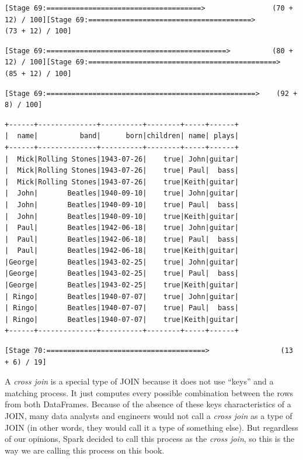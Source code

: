 \documentclass[
  11pt,
  letterpaper,
  DIV=11,
  numbers=noendperiod]{scrreprt}
\begin{document}
\begin{verbatim}
[Stage 69:=====================================>                (70 + 12) / 100][Stage 69:=======================================>              (73 + 12) / 100]
\end{verbatim}

\begin{verbatim}
[Stage 69:===========================================>          (80 + 12) / 100][Stage 69:=============================================>        (85 + 12) / 100]
\end{verbatim}

\begin{verbatim}
[Stage 69:==================================================>    (92 + 8) / 100]                                                                                
\end{verbatim}

\begin{verbatim}
+------+--------------+----------+--------+-----+------+
|  name|          band|      born|children| name| plays|
+------+--------------+----------+--------+-----+------+
|  Mick|Rolling Stones|1943-07-26|    true| John|guitar|
|  Mick|Rolling Stones|1943-07-26|    true| Paul|  bass|
|  Mick|Rolling Stones|1943-07-26|    true|Keith|guitar|
|  John|       Beatles|1940-09-10|    true| John|guitar|
|  John|       Beatles|1940-09-10|    true| Paul|  bass|
|  John|       Beatles|1940-09-10|    true|Keith|guitar|
|  Paul|       Beatles|1942-06-18|    true| John|guitar|
|  Paul|       Beatles|1942-06-18|    true| Paul|  bass|
|  Paul|       Beatles|1942-06-18|    true|Keith|guitar|
|George|       Beatles|1943-02-25|    true| John|guitar|
|George|       Beatles|1943-02-25|    true| Paul|  bass|
|George|       Beatles|1943-02-25|    true|Keith|guitar|
| Ringo|       Beatles|1940-07-07|    true| John|guitar|
| Ringo|       Beatles|1940-07-07|    true| Paul|  bass|
| Ringo|       Beatles|1940-07-07|    true|Keith|guitar|
+------+--------------+----------+--------+-----+------+
\end{verbatim}

\begin{verbatim}
[Stage 70:======================================>                 (13 + 6) / 19]                                                                                
\end{verbatim}

A \emph{cross join} is a special type of JOIN because it does not use
``keys'' and a matching process. It just computes every possible
combination between the rows from both DataFrames. Because of the
absence of these keys characteristics of a JOIN, many data analysts and
engineers would not call a \emph{cross join} as a type of JOIN (in other
words, they would call it a type of something else). But regardless of
our opinions, Spark decided to call this process as the \emph{cross
join}, so this is the way we are calling this process on this book.
\end{document}
